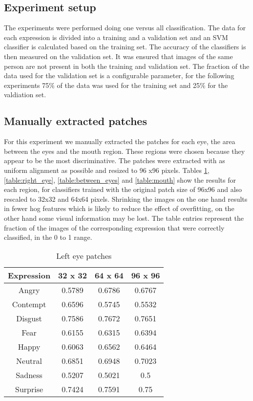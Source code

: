 \subsection{Experiment setup}
The experiments were performed doing one versus all classification. The data for each expression is divided into a training and a validation set and an SVM
classifier is calculated based on the training set. The accuracy of the classifiers is then measured on the validation set. It was ensured that images of the same
person are not present in both the training and validation set. The fraction of the data used for the validation set is a configurable parameter, for the 
following experiments 75\% of the data was used for the training set and 25\% for the valdiation set. 

\subsection{Manually extracted patches}
For this experiment we manually extracted the patches for each eye, the area between the eyes and the mouth region. These regions were chosen because they 
appear to be the most discriminative. The patches were extracted with as uniform alignment as possible and resized to 96 x96 pixels. 
Tables \ref{table:left_eye}, \ref{table:right_eye}, \ref{table:between_eyes} and \ref{table:mouth} show the results for each region, for classifiers trained 
with the original patch size of 96x96 and also rescaled to 32x32 and 64x64 pixels. Shrinking the images on the one hand results in fewer hog features which
is likely to reduce the effect of overfitting, on the other hand some visual information may be lost. The table entries represent the fraction of the
images of the corresponding expression that were correctly classified, in the 0 to 1 range.


\begin{table}
\caption{Left eye patches}
\label{table:left_eye}

\begin{tabular}{| c | c | c | c |}
\hline
Expression & 32 x 32 &  64 x 64  & 96 x 96  \\

\hline
Angry & 0.5789 & 0.6786 & 0.6767 \\
Contempt & 0.6596 &	0.5745 & 0.5532 \\
Disgust	& 0.7586 &	0.7672 &	0.7651 \\
Fear &	0.6155 & 0.6315 & 0.6394 \\ 
Happy &	0.6063 & 0.6562 & 0.6464 \\ 
Neutral & 0.6851 &	0.6948 & 0.7023 \\
Sadness & 0.5207 & 0.5021 &	0.5 \\
Surprise & 0.7424 &	0.7591 & 0.75 \\

\hline
\end{tabular}
\end{table}

